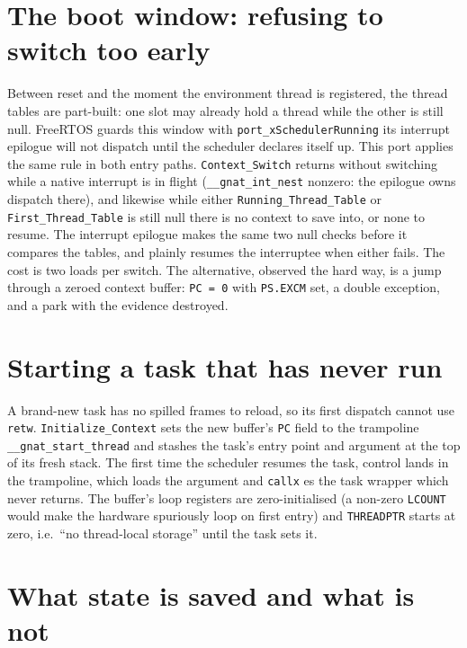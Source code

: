 \section{The boot window: refusing to switch too early}

Between reset and the moment the environment thread is registered, the thread
tables are part-built: one slot may already hold a thread while the other is
still null.  FreeRTOS guards this window with
\texttt{port\_xSchedulerRunning} \textemdash{} its interrupt epilogue will not
dispatch until the scheduler declares itself up.  This port applies the same
rule in both entry paths.  \texttt{Context\_Switch} returns without switching
while a native interrupt is in flight (\texttt{\_\_gnat\_int\_nest} nonzero:
the epilogue owns dispatch there), and likewise while either
\texttt{Running\_Thread\_Table} or \texttt{First\_Thread\_Table} is still
null \textemdash{} there is no context to save into, or none to resume.  The
interrupt epilogue makes the same two null checks before it compares the
tables, and plainly resumes the interruptee when either fails.  The cost is two
loads per switch.  The alternative, observed the hard way, is a jump through a
zeroed context buffer: \texttt{PC = 0} with \texttt{PS.EXCM} set, a double
exception, and a park with the evidence destroyed.

\section{Starting a task that has never run}

A brand-new task has no spilled frames to reload, so its first dispatch cannot use
\texttt{retw}. \texttt{Initialize\_Context} sets the new buffer's \texttt{PC} field
to the trampoline \texttt{\_\_gnat\_start\_thread} and stashes the task's entry
point and argument at the top of its fresh stack. The first time the scheduler
resumes the task, control lands in the trampoline, which loads the argument and
\texttt{callx} es the task wrapper \textemdash{} which never returns. The buffer's
loop registers are zero-initialised (a non-zero \texttt{LCOUNT} would make the
hardware spuriously loop on first entry) and \texttt{THREADPTR} starts at zero,
i.e.\ ``no thread-local storage'' until the task sets it.

\section{What state is saved \textemdash{} and what is not}

